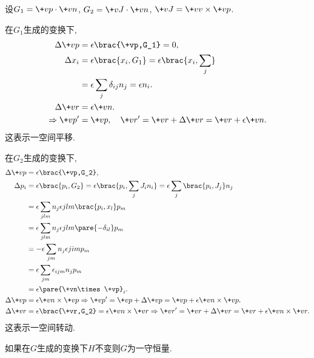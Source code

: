 \documentclass[../LectureNotes.tex]{subfiles}
\begin{document}
\begin{sample}
    \begin{ex}
        设$G_1 = \+vp\cdot\+vn$, $G_2 = \+vJ\cdot\+vn$, $\+vJ = \+vv\times\+vp$.
        \begin{cenum}
            \item 在$G_1$生成的变换下,
            \begin{align*}
                \Delta \+vp &= \epsilon\brac{\+vp,G_1} = 0, \\
                \Delta x_i &= \epsilon\brac{x_i,G_1} = \epsilon\brac{x_i,\sum_j} \\
                &= \epsilon \sum_j \delta_{ij}n_j = \epsilon n_i. \\
                \Delta\+vr &= \epsilon \+vn. \\
                \Rightarrow \+vp' &= \+vp,\quad \+vr' = \+vr+\Delta\+vr = \+vr + \epsilon \+vn.
            \end{align*}
            这表示一空间平移.
            \item 在$G_2$生成的变换下,
            \begin{align*}
                \Delta \+vp &= \epsilon\brac{\+vp,G_2}, \\
                \Delta p_i &= \epsilon\brac{p_i,G_2} = \epsilon\brac{p_i,\sum_j J_i n_i} = \epsilon \sum_j \brac{p_i,J_j}n_j \\
                &= \epsilon \sum_{jlm} n_j\epsilon{jlm}\brac{p_i,x_l}p_m \\
                &= \epsilon \sum_{jlm} n_j\epsilon{jlm}\pare{-\delta_{il}}p_m \\
                &= -\epsilon \sum_{jm} n_j \epsilon{jim}p_m \\
                &= \epsilon\sum_{jm}\epsilon_{ijm}n_j p_m \\
                &= \epsilon\pare{\+vn\times\+vp}_i. \\
                \Delta \+vp &= \epsilon \+vn\times \+vp \Rightarrow \+vp' = \+vp+\Delta \+vp = \+vp + \epsilon\+vn\times\+vp. \\
                \Delta \+vr &= \epsilon\brac{\+vr,G_2} = \epsilon\+vn\times\+vr\Rightarrow \+vr' = \+vr + \Delta\+vr = \+vr + \epsilon\+vn\times\+vr.
            \end{align*}
            这表示一空间转动.
        \end{cenum}
    \end{ex}
\end{sample}
\begin{remark}
    如果在$G$生成的变换下$H$不变则$G$为一守恒量.
\end{remark}
\end{document}
